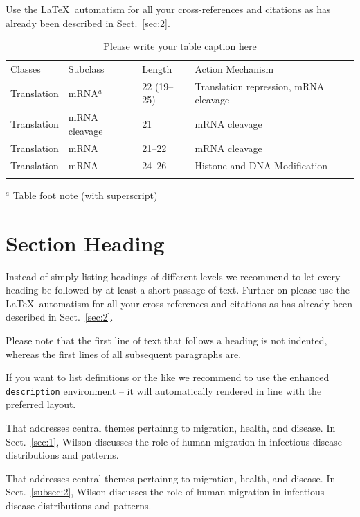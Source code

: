  Use the \LaTeX\ automatism for all your cross-refer\-ences and citations as has already been described in Sect.~\ref{sec:2}.
%
%
\begin{table}[!t]
\caption{Please write your table caption here}
\label{tab:1}       %
%
%
\begin{tabular}{p{2cm}p{2.4cm}p{2cm}p{4.9cm}}
\hline\noalign{\smallskip}
Classes & Subclass & Length & Action Mechanism  \\
\noalign{\smallskip}\svhline\noalign{\smallskip}
Translation & mRNA$^a$  & 22 (19--25) & Translation repression, mRNA cleavage\\
Translation & mRNA cleavage & 21 & mRNA cleavage\\
Translation & mRNA  & 21--22 & mRNA cleavage\\
Translation & mRNA  & 24--26 & Histone and DNA Modification\\
\noalign{\smallskip}\hline\noalign{\smallskip}
\end{tabular}
$^a$ Table foot note (with superscript)
\end{table}
%
\section{Section Heading}
\label{sec:3}
Instead of simply listing headings of different levels we recommend to let every heading be followed by at least a short passage of text.  Further on please use the \LaTeX\ automatism for all your cross-references and citations as has already been described in Sect.~\ref{sec:2}.

Please note that the first line of text that follows a heading is not indented, whereas the first lines of all subsequent paragraphs are.

If you want to list definitions or the like we recommend to use the enhanced \verb|description| environment -- it will automatically rendered in line with the preferred layout.

\begin{description}[Type 1]
\item[Type 1]{That addresses central themes pertainng to migration, health, and disease. In Sect.~\ref{sec:1}, Wilson discusses the role of human migration in infectious disease distributions and patterns.}
\item[Type 2]{That addresses central themes pertainng to migration, health, and disease. In Sect.~\ref{subsec:2}, Wilson discusses the role of human migration in infectious disease distributions and patterns.}
\end{description}

